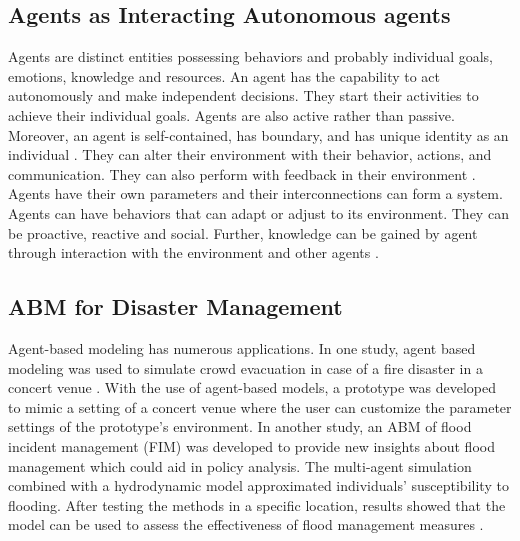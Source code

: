 \documentclass[runningheads]{llncs}
\begin{document}
 
	
\subsection{Agents as Interacting Autonomous agents}

Agents are distinct entities possessing behaviors and probably individual goals, emotions, knowledge and resources. An agent has the capability to act autonomously and make independent decisions. They start their activities to achieve their individual goals. Agents are also active rather than passive. Moreover, an agent is self-contained, has boundary, and has unique identity as an individual \cite{bonabeau2002agent}. They can alter their environment with their behavior, actions, and communication. They can also perform with feedback in their environment \cite{casalicchio2006modelling}. Agents have their own parameters and their interconnections can form a system. Agents can have behaviors that can adapt or adjust to its environment. They can be proactive, reactive and social. Further, knowledge can be gained by agent through interaction with the environment and other agents \cite{bonabeau2002agent}. 


\subsection{ABM for Disaster Management}
Agent-based modeling has numerous applications. In one study, agent based modeling was used to simulate crowd evacuation in case of a fire disaster in a concert venue \cite{wagner2014agent}. With the use of agent-based models, a prototype was developed to mimic a setting of a concert venue where the user can customize the parameter settings of the prototype’s environment. In another study, an ABM of flood incident management (FIM) was developed to provide new insights about flood management which could aid in policy analysis. The multi-agent simulation combined with a hydrodynamic model approximated individuals’ susceptibility to flooding. After testing the methods in a specific location, results showed that the model can be used to assess the effectiveness of flood management measures \cite{dawson2011agent}.
	
\end{document}
